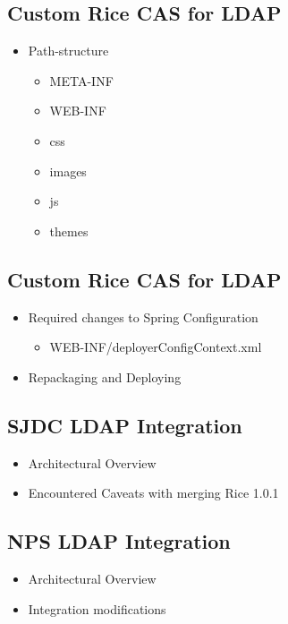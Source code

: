 \documentclass[12pt,notitlepage]{article}
\begin{document}
\begin{s5presentation}
  \W \begin{s5slide}
    \W \section{Custom Rice CAS for LDAP}
    \begin{itemize}
      \item Path-structure
        \begin{itemize}
          \item META-INF  
          \item WEB-INF
          \item css 
          \item images    
          \item js 
          \item themes
        \end{itemize}
    \end{itemize}
  \W \end{s5slide}
  \W \begin{s5slide}
    \W \section{Custom Rice CAS for LDAP}
    \begin{itemize}
      \item Required changes to Spring Configuration
        \begin{itemize}
        \item WEB-INF/deployerConfigContext.xml
        \end{itemize}
      \item Repackaging and Deploying
    \end{itemize}
    \W \end {s5slide}

  \W \begin{s5slide}
    \W \section{SJDC LDAP Integration}
    \begin{itemize}
      \item Architectural Overview
      \item Encountered Caveats with merging Rice 1.0.1
    \end{itemize}
    \W \end {s5slide}

  \W \begin{s5slide}
    \W \section{NPS LDAP Integration}
    \begin{itemize}
      \item Architectural Overview
      \item Integration modifications
        

\end{itemize}
\end{s5slide}
\end{s5presentation}
\end{document}
